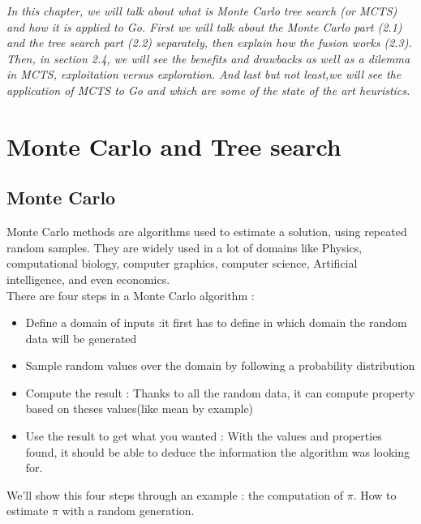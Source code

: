 
\textit{In this chapter, we will talk about what is Monte Carlo tree search (or MCTS) and how it is applied to Go.
First we will talk about the Monte Carlo part (2.1) and the tree search part (2.2) separately, then explain how the fusion works (2.3).
Then, in section 2.4, we will see the benefits and drawbacks as well as a dilemma in MCTS, exploitation versus exploration. 
And last but not least,we will see the application of MCTS to Go and which are some of the state of the art heuristics. }

\section{Monte Carlo and Tree search}

\subsection{Monte Carlo}

Monte Carlo methods are algorithms used to estimate a solution, using repeated random samples. They are widely used in a lot of domains like Physics, computational biology, computer graphics, computer science, Artificial intelligence, and even economics. 
\\

There are four steps in a Monte Carlo algorithm : 

\begin{itemize}
\item Define a domain of inputs :it first has to define in which domain the random data will be generated
\item Sample random values over the domain by following a probability distribution 
\item Compute the result : Thanks to all the random data, it can compute property based on theses values(like mean by example)
\item Use the result to get what you wanted : With the values and properties found, it should be able to deduce the information the algorithm was looking for. 
\end{itemize} 

We'll show this four steps through an example : the computation of $\pi$. How to estimate $\pi$ with a random generation. 

